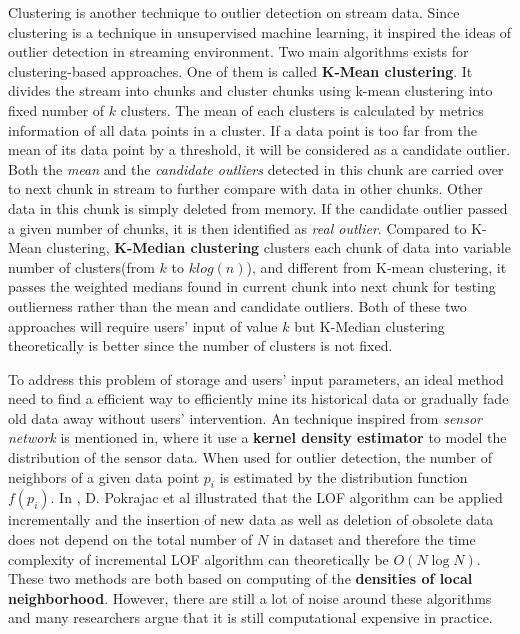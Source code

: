 \documentclass[11pt]{article}       %
\begin{document}
Clustering is another technique to outlier detection on stream data. Since clustering is a technique in unsupervised machine learning, it inspired the ideas of outlier detection in streaming environment. Two main algorithms exists for clustering-based approaches. One of them is called \textbf{K-Mean clustering}\cite{04666541}. It divides the stream into chunks and cluster chunks using k-mean clustering into fixed number of $k$ clusters. The mean of each clusters is calculated by metrics information of all data points in a cluster. If a data point is too far from the mean of its data point by a threshold, it will be considered as a candidate outlier. Both the \textit{mean} and the \textit{candidate outliers} detected in this chunk are carried over to next chunk in stream to further compare with data in other chunks. Other data in this chunk is simply deleted from memory. If the candidate outlier passed a given number of chunks, it is then identified as \textit{real outlier}. Compared to K-Mean clustering, \textbf{K-Median clustering}\cite{DBLP:journals/corr/abs-1002-4003} clusters each chunk of data into variable number of clusters(from $k$ to $k log(n)$), and different from K-mean clustering, it passes the weighted medians found in current chunk into next chunk for testing outlierness rather than the mean and candidate outliers. Both of these two approaches will require users' input of value $k$ but K-Median clustering theoretically is better since the number of clusters is not fixed. 

To address this problem of storage and users' input parameters, an ideal method need to find a efficient way to efficiently mine its historical data or gradually fade old data away without users' intervention. An technique inspired from \textit{sensor network} is mentioned in\cite{Subramaniam:2006:OOD:1182635.1164145}, where it use a \textbf{kernel density estimator} to model the distribution of the sensor data. When used for outlier detection, the number of neighbors of a given data point $p_{i}$ is estimated by the distribution function $f(p_{i})$. In \cite{4221341}, D. Pokrajac et al illustrated that the LOF algorithm can be applied incrementally and the insertion of new data as well as deletion of obsolete data does not depend on the total number of $N$ in dataset and therefore the time complexity of incremental LOF algorithm can theoretically be $O(N\log{N})$. These two methods are both based on computing of the \textbf{densities of local neighborhood}. However, there are still a lot of noise around these algorithms and many researchers argue that it is still computational expensive in practice. 
\end{document}
